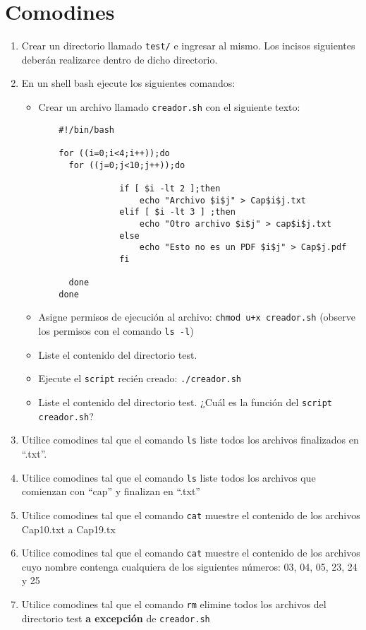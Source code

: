 \documentclass[12pt]{article}
\begin{document}
\section*{Comodines}
\begin{enumerate}
\item Crear un directorio llamado \texttt{test/} e ingresar al mismo.
Los incisos siguientes deberán realizarce dentro de dicho directorio. 
\item En un shell bash ejecute los siguientes comandos:
	\begin{itemize}
	\item Crear un archivo llamado \texttt{creador.sh} con el siguiente texto:
	\begin{verbatim}
	#!/bin/bash

	for ((i=0;i<4;i++));do 
	  for ((j=0;j<10;j++));do 

                if [ $i -lt 2 ];then 
                    echo "Archivo $i$j" > Cap$i$j.txt
                elif [ $i -lt 3 ] ;then 
                    echo "Otro archivo $i$j" > cap$i$j.txt
                else
                    echo "Esto no es un PDF $i$j" > Cap$j.pdf
                fi

	  done 
	done
	\end{verbatim}
	\item Asigne permisos de ejecución al archivo: \texttt{chmod u+x creador.sh} (observe los permisos con el comando \texttt{ls -l})
	\item Liste el contenido del directorio test.
	\item Ejecute el \texttt{script} recién creado: \texttt{./creador.sh}
	\item Liste  el contenido del directorio test. ¿Cuál es la función del \texttt{script creador.sh}? 
 	\end{itemize}
\item Utilice comodines tal que el comando \texttt{ls} liste todos los archivos finalizados en ``.txt''.
\item Utilice comodines tal que el comando \texttt{ls} liste todos los archivos que comienzan con ``cap'' y finalizan en ``.txt''
\item Utilice comodines tal que el comando \texttt{cat} muestre el contenido de los archivos Cap10.txt a Cap19.tx
\item Utilice comodines tal que el comando \texttt{cat} muestre el contenido de los archivos cuyo nombre contenga cualquiera de los siguientes números: 03, 04, 05, 23, 24 y 25 
\item Utilice comodines tal que el comando \texttt{rm} elimine todos los archivos del directorio test \textbf{a excepción} de \texttt{creador.sh}
\end{enumerate}
\end{document}
